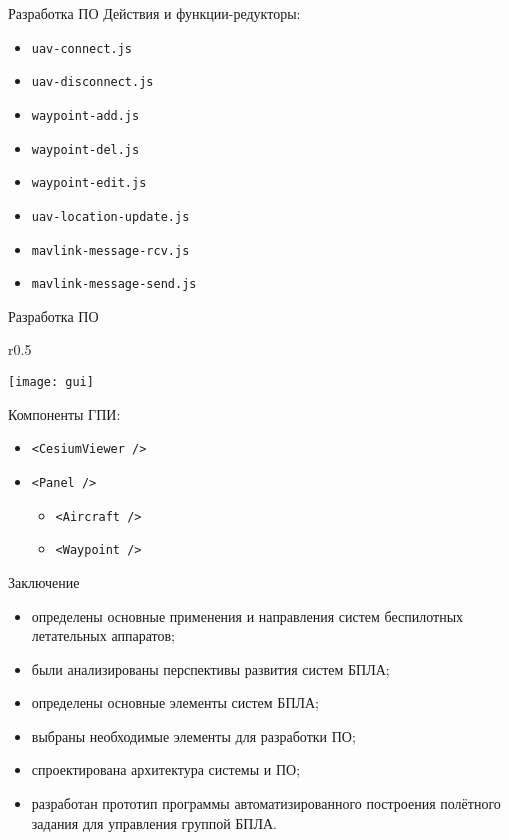 \documentclass[aspectratio=169]{beamer}
\begin{document}
\begin{frame}{Разработка ПО}
  Действия и функции-редукторы:

  \begin{itemize}
    \item \texttt{uav-connect.js}
    \item \texttt{uav-disconnect.js}
    \item \texttt{waypoint-add.js}
    \item \texttt{waypoint-del.js}
    \item \texttt{waypoint-edit.js}
    \item \texttt{uav-location-update.js}
    \item \texttt{mavlink-message-rcv.js}
    \item \texttt{mavlink-message-send.js}
  \end{itemize}
\end{frame}


\begin{frame}{Разработка ПО}
  \begin{wrapfigure}{r}{0.5\textwidth}
    \begin{center}
      \texttt{[image: gui]}
    \end{center}
  \end{wrapfigure}
  Компоненты ГПИ:

  \begin{itemize}
    \item \texttt{<CesiumViewer />}
    \item \texttt{<Panel />}
      \begin{itemize}
        \item \texttt{<Aircraft />}
        \item \texttt{<Waypoint />}
      \end{itemize}
  \end{itemize}
\end{frame}


\begin{frame}{Заключение}
  \begin{itemize}
    \item определены основные применения и направления систем беспилотных
      летательных аппаратов;
    \item были анализированы перспективы развития систем БПЛА;
    \item определены основные элементы систем БПЛА;
    \item выбраны необходимые элементы для разработки ПО;
    \item спроектирована архитектура системы и ПО;
    \item разработан прототип программы автоматизированного построения полётного
      задания для управления группой БПЛА.
  \end{itemize}
\end{frame}


\begin{frame}[plain]
\end{frame}

\end{document}
